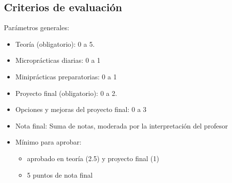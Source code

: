 \documentclass[a4paper,12pt]{article}
\begin{document}


\subsection{Criterios de evaluación}

Parámetros generales:

\begin{itemize}
\item Teoría (obligatorio): 0 a 5.
\item Microprácticas diarias: 0 a 1
\item Miniprácticas preparatorias: 0 a 1
\item Proyecto final (obligatorio): 0 a 2.
\item Opciones y mejoras del proyecto final: 0 a 3
\item Nota final: Suma de notas, moderada por la interpretación del profesor
\item Mínimo para aprobar:
      \begin{itemize}
      \item aprobado en teoría (2.5) y proyecto final (1)
      \item 5 puntos de nota final
      \end{itemize}
\end{itemize}
\end{document}
